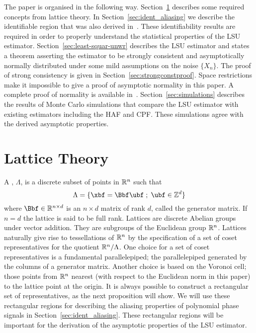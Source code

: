 \documentclass[journal]{IEEEtran}
\begin{document}
The paper is organised in the following way. Section~\ref{sec:lattice-theory} describes some required concepts from lattice theory.  In Section~\ref{sec:ident_aliasing} we describe the identifiable region that was also derived in~\cite{McKilliam2009IndentifiabliltyAliasingPolyphase}.  These identifiability results are required in order to properly understand the statistical properties of the LSU estimator.  Section~\ref{sec:least-squar-unwr} describes the LSU estimator and states a theorem asserting the estimator to be strongly consistent and asymptotically normally distributed under some mild assumptions on the noise $\{X_n\}$. The proof of strong consistency is given in Section~\ref{sec:strongconstproof}.  Space restrictions make it impossible to give a proof of asymptotic normality in this paper.  A complete proof of normality is available in~\cite{McKilliam_arxiv_pps_unwrapping_2012}.  Section~\ref{sec:simulations} describes the results of Monte Carlo simulations that compare the LSU estimator with existing estimators including the HAF and CPF.  These simulations agree with the derived asymptotic properties.




\section{Lattice Theory}\label{sec:lattice-theory}

A ,  $\Lambda$, is a discrete subset of points in ${\mathbb R}^n$ such that
\[
   \Lambda = \{\xbf = \Bbf\ubf \mid \ubf \in \ints^d \}
\]
where $\Bbf \in \reals^{n \times d}$ is an $n \times d$ matrix of rank $d$, called the generator matrix.  If $n = d$ the lattice is said to be full rank.  Lattices are discrete Abelian groups under vector addition.  They are subgroups of the Euclidean group ${\mathbb R}^n$.  Lattices naturally give rise to tessellations of ${\mathbb R}^n$ by the specification of a set of coset representatives for the quotient ${\mathbb R}^n / \Lambda$.  One choice for a set of coset representatives is a fundamental parallelepiped; the parallelepiped generated by the columns of a generator matrix.  Another choice is based on the Voronoi cell; those points from ${\mathbb R}^n$ nearest (with respect to the Euclidean norm in this paper) to the lattice point at the origin.  It is always possible to construct a rectangular set of representatives, as the next proposition will show.  We will use these rectangular regions for describing the aliasing properties of polynomial phase signals in Section~\ref{sec:ident_aliasing}.  These rectangular regions will be important for the derivation of the asymptotic properties of the LSU estimator.
\end{document}

